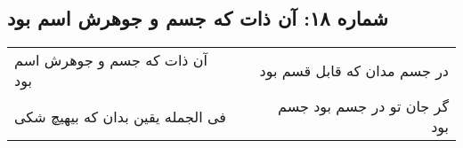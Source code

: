 \begin{center}
\section*{شماره ۱۸: آن ذات که جسم و جوهرش اسم بود}
\label{sec:018}
\begin{longtable}{l p{0.5cm} r}
آن ذات که جسم و جوهرش اسم بود
&&
در جسم مدان که قابل قسم بود
\\
فی الجمله یقین بدان که بیهیچ شکی
&&
گر جان تو در جسم بود جسم بود
\\
\end{longtable}
\end{center}
